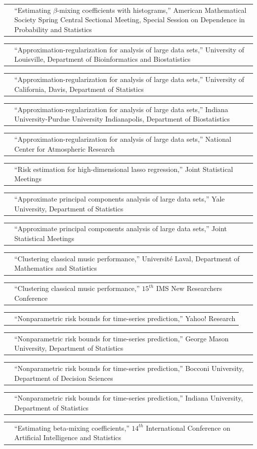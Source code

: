 \documentclass[11pt,letterpaper]{minimal/moderncv}
\makeatletter
\renewcommand*{\cvitem}[2]{%
  \begin{tabular}{@{}p{\hintscolumnwidth}@{\hspace{\separatorcolumnwidth}}%
    p{\maincolumnwidth}@{}}%
    \raggedleft {#1} &  {#2}%
  \end{tabular}%
}
\makeatother
\begin{document}
\cvitem{}{ ``Estimating $\beta$-mixing coefficients with histograms,''
  American Mathematical Society Spring Central Sectional Meeting,
  Special Session on Dependence in Probability and Statistics}

\cvitem{2016}{ ``Approximation-regularization for analysis of large data sets,''
  University of Louisville, Department of Bioinformatics and
  Biostatistics}

\cvitem{}{ ``Approximation-regularization for analysis of large data
  sets,''  University of California, Davis, Department of Statistics}

\cvitem{}{ ``Approximation-regularization for analysis of large data
  sets,''  Indiana University-Purdue University Indianapolis, Department
  of Biostatistics}

\cvitem{}{ ``Approximation-regularization for analysis of large data
  sets,''  National Center for Atmospheric Research}

\cvitem{}{ ``Risk estimation for high-dimensional lasso regression,'' Joint
  Statistical Meetings}

\cvitem{2015}{ ``Approximate principal components analysis of large data sets,''
  Yale University, Department of Statistics}

\cvitem{2014}{ ``Approximate principal components analysis of large data sets,''
  Joint Statistical Meetings}

\cvitem{}{ ``Clustering classical music performance,''
  Universit\'e Laval, Department of Mathematics and Statistics}

\cvitem{2013}{ ``Clustering classical music performance,'' $15^{th}$ IMS New Researchers Conference}

\cvitem{2012}{``Nonparametric risk bounds for time-series
  prediction,'' Yahoo! Research} 

\cvitem{}{``Nonparametric risk bounds for time-series prediction,'' George
  Mason University, Department of Statistics}

\cvitem{}{``Nonparametric risk bounds for time-series prediction,''
  Bocconi University, Department of Decision Sciences}

\cvitem{}{``Nonparametric risk bounds for time-series prediction,''
  Indiana University, Department of Statistics}

\cvitem{}{``Estimating beta-mixing coefficients,'' $14^{th}$
  International Conference on Artificial Intelligence and Statistics}
\end{document}
